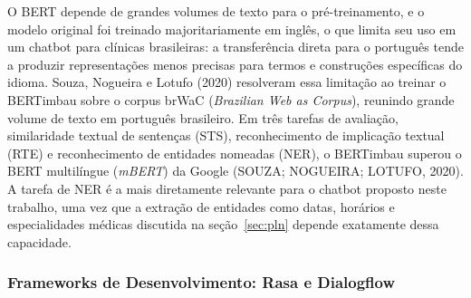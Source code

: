 \documentclass[12pt,a4paper]{extarticle}
\begin{document}

O BERT depende de grandes volumes de texto para o pré-treinamento, e o modelo original foi treinado majoritariamente em inglês, o que limita seu uso em um chatbot para clínicas brasileiras: a transferência direta para o português tende a produzir representações menos precisas para termos e construções específicas do idioma. Souza, Nogueira e Lotufo (2020) resolveram essa limitação ao treinar o BERTimbau sobre o corpus brWaC (\textit{Brazilian Web as Corpus}), reunindo grande volume de texto em português brasileiro. Em três tarefas de avaliação, similaridade textual de sentenças (STS), reconhecimento de implicação textual (RTE) e reconhecimento de entidades nomeadas (NER), o BERTimbau superou o BERT multilíngue (\textit{mBERT}) da Google (SOUZA; NOGUEIRA; LOTUFO, 2020). A tarefa de NER é a mais diretamente relevante para o chatbot proposto neste trabalho, uma vez que a extração de entidades como datas, horários e especialidades médicas discutida na seção~\ref{sec:pln} depende exatamente dessa capacidade.

\subsubsection{Frameworks de Desenvolvimento: Rasa e Dialogflow}
\label{sec:rasa-dialogflow}
\end{document}
